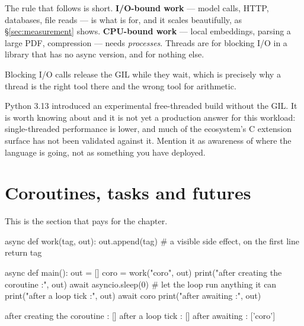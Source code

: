 \begin{note}
The rule that follows is short. \textbf{I/O-bound work} --- model calls, HTTP,
databases, file reads --- is what  is for, and it scales
beautifully, as \S\ref{sec:measurement} shows. \textbf{CPU-bound work} --- local
embeddings, parsing a large PDF, compression --- needs \emph{processes}. Threads
are for blocking I/O in a library that has no async version, and for nothing
else.

Blocking I/O calls release the GIL while they wait, which is precisely why a
thread is the right tool there and the wrong tool for arithmetic.
\end{note}

\begin{versionbox}
Python 3.13 introduced an experimental free-threaded build without the GIL. It
is worth knowing about and it is not yet a production answer for this workload:
single-threaded performance is lower, and much of the ecosystem's C extension
surface has not been validated against it. Mention it as awareness of where the
language is going, not as something you have deployed.
\end{versionbox}

\section{Coroutines, tasks and futures}
\label{sec:cold-coroutine}

This is the section that pays for the chapter.

\begin{python}[caption={A coroutine does not start when you create it}, label={lst:cold}]
async def work(tag, out):
    out.append(tag)          # a visible side effect, on the first line
    return tag


async def main():
    out = []
    coro = work("coro", out)
    print("after creating the coroutine :", out)
    await asyncio.sleep(0)               # let the loop run anything it can
    print("after a loop tick            :", out)
    await coro
    print("after awaiting               :", out)
\end{python}

\begin{console}
after creating the coroutine : []
after a loop tick            : []
after awaiting               : ['coro']
\end{console}

